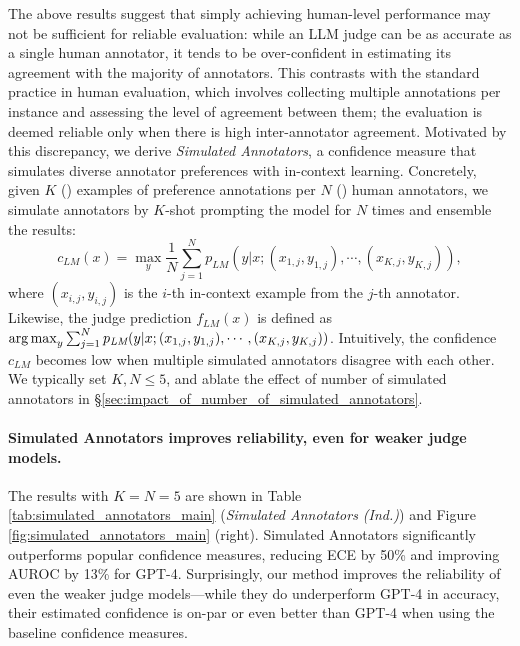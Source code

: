 The above results suggest that simply achieving human-level performance may not be sufficient for reliable evaluation: while an LLM judge can be as accurate as a single human annotator, it tends to be over-confident in estimating its agreement with the majority of annotators. This contrasts with the standard practice in human evaluation, which involves collecting multiple annotations per instance and assessing the level of agreement between them; the evaluation is deemed reliable only when there is high inter-annotator agreement. Motivated by this discrepancy, we derive \textit{Simulated Annotators}, a confidence measure that simulates diverse annotator preferences with in-context learning. Concretely, given $K$ () examples of preference annotations per $N$ () human annotators, we simulate annotators by $K$-shot prompting the model for $N$ times and ensemble the results:
\begin{equation*}
    c_\textit{LM}(x) = \max_{y} \frac{1}{N} \sum_{j=1}^{N} p_\textit{LM}(y|x;(x_{1,j}, y_{1,j}), \cdots, (x_{K,j}, y_{K,j})),
\end{equation*}
where $(x_{i,j}, y_{i,j})$ is the $i$-th in-context example from the $j$-th annotator. Likewise, the judge prediction $f_\textit{LM}(x)$ is defined as $\operatorname*{arg\,max}_{y} \sum_{j=1}^{N} p_\textit{LM}(y|x;(x_{1,j}, y_{1,j}), \cdots, (x_{K,j}, y_{K,j}))$. Intuitively, the confidence $c_\textit{LM}$ becomes low when multiple simulated annotators disagree with each other. We typically set $K, N \le 5$, and ablate the effect of number of simulated annotators in \S \ref{sec:impact_of_number_of_simulated_annotators}.

\paragraph{Simulated Annotators improves reliability, even for weaker judge models.} The results with $K = N = 5$ are shown in Table \ref{tab:simulated_annotators_main} (\textit{Simulated Annotators (Ind.)}) and Figure \ref{fig:simulated_annotators_main} (right). Simulated Annotators significantly outperforms popular confidence measures, reducing ECE by 50\% and improving AUROC by 13\% for GPT-4. Surprisingly, our method improves the reliability of even the weaker judge models---while they do underperform GPT-4 in accuracy, their estimated confidence is on-par or even better than GPT-4 when using the baseline confidence measures.

